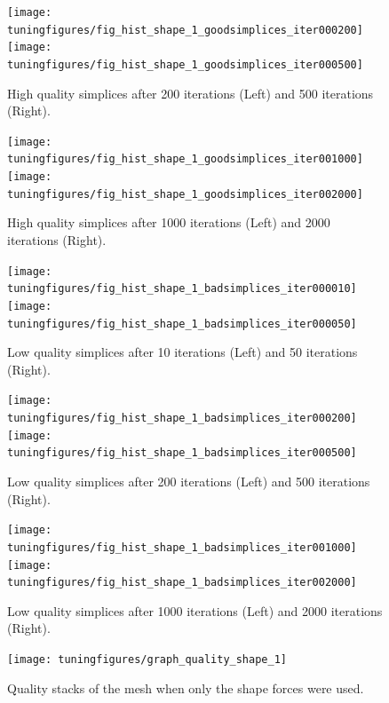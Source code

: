 \documentclass[10pt,a4paper]{book}
\begin{document}
\begin{figure}[tbhp]
\centerline{\texttt{[image: tuningfigures/fig\_hist\_shape\_1\_goodsimplices\_iter000200]}\hspace{3cm}\texttt{[image: tuningfigures/fig\_hist\_shape\_1\_goodsimplices\_iter000500]}}
\caption{\label{fig:fig_hist_shape_1_goodsimplices_iter000200} High quality simplices after 200 iterations (Left) and 500 iterations (Right).}
\end{figure}

\begin{figure}[tbhp]
\centerline{\texttt{[image: tuningfigures/fig\_hist\_shape\_1\_goodsimplices\_iter001000]}\hspace{3cm}\texttt{[image: tuningfigures/fig\_hist\_shape\_1\_goodsimplices\_iter002000]}}
\caption{\label{fig:fig_hist_shape_1_goodsimplices_iter001000} High quality simplices after 1000 iterations (Left) and 2000 iterations (Right).}
\end{figure}


\begin{figure}[tbhp]
\centerline{\texttt{[image: tuningfigures/fig\_hist\_shape\_1\_badsimplices\_iter000010]}\hspace{3cm}\texttt{[image: tuningfigures/fig\_hist\_shape\_1\_badsimplices\_iter000050]}}
\caption{\label{fig:fig_hist_shape_1_badsimplices_iter000010} Low quality simplices after 10 iterations (Left) and 50 iterations (Right).}
\end{figure}

\begin{figure}[tbhp]
\centerline{\texttt{[image: tuningfigures/fig\_hist\_shape\_1\_badsimplices\_iter000200]}\hspace{3cm}\texttt{[image: tuningfigures/fig\_hist\_shape\_1\_badsimplices\_iter000500]}}
\caption{\label{fig:fig_hist_shape_1_badsimplices_iter000200} Low quality simplices after 200 iterations (Left) and 500 iterations (Right).}
\end{figure}

\begin{figure}[tbhp]
\centerline{\texttt{[image: tuningfigures/fig\_hist\_shape\_1\_badsimplices\_iter001000]}\hspace{3cm}\texttt{[image: tuningfigures/fig\_hist\_shape\_1\_badsimplices\_iter002000]}}
\caption{\label{fig:fig_hist_shape_1_badsimplices_iter001000} Low quality simplices after 1000 iterations (Left) and 2000 iterations (Right).}
\end{figure}

\clearpage
\begin{figure}[tbhp]
\centerline{\texttt{[image: tuningfigures/graph\_quality\_shape\_1]}}
\caption{\label{fig:graph_quality_shape_1} Quality stacks of the mesh when only the shape forces were used.}
\end{figure}
\end{document}
